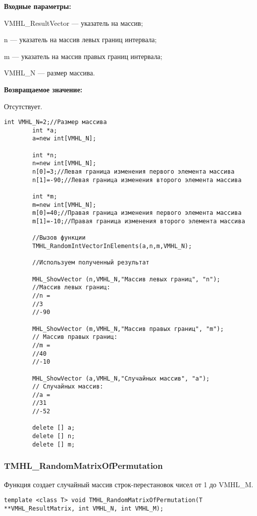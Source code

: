 \documentclass[a4paper,12pt]{article}
\begin{document}
\textbf{Входные параметры:}
 
VMHL\_ResultVector --- указатель на массив;
 
n --- указатель на массив левых границ интервала;
 
m --- указатель на массив правых границ интервала;
 
VMHL\_N --- размер массива.

\textbf{Возвращаемое значение:}

Отсутствует.


\begin{lstlisting}[label=code_use_TMHL_RandomIntVectorInElements,caption=Пример использования]
        int VMHL_N=2;//Размер массива
        int *a;
        a=new int[VMHL_N];

        int *n;
        n=new int[VMHL_N];
        n[0]=3;//Левая граница изменения первого элемента массива
        n[1]=-90;//Левая граница изменения второго элемента массива

        int *m;
        m=new int[VMHL_N];
        m[0]=40;//Правая граница изменения первого элемента массива
        m[1]=-10;//Правая граница изменения второго элемента массива

        //Вызов функции
        TMHL_RandomIntVectorInElements(a,n,m,VMHL_N);

        //Используем полученный результат

        MHL_ShowVector (n,VMHL_N,"Массив левых границ", "n");
        //Массив левых границ:
        //n =
        //3
        //-90

        MHL_ShowVector (m,VMHL_N,"Массив правых границ", "m");
        // Массив правых границ:
        //m =
        //40
        //-10

        MHL_ShowVector (a,VMHL_N,"Случайных массив", "a");
        // Случайных массив:
        //a =
        //31
        //-52

        delete [] a;
        delete [] n;
        delete [] m;
\end{lstlisting}

\subsubsection{TMHL\_RandomMatrixOfPermutation}\label{TMHL_RandomMatrixOfPermutation}

Функция создает случайный массив строк-перестановок чисел от 1 до VMHL\_M.


\begin{lstlisting}[label=code_syntax_TMHL_RandomMatrixOfPermutation,caption=Синтаксис]
template <class T> void TMHL_RandomMatrixOfPermutation(T **VMHL_ResultMatrix, int VMHL_N, int VMHL_M);
\end{lstlisting}
\end{document}
